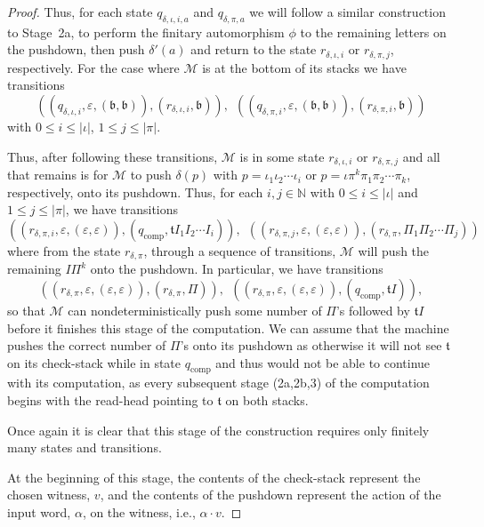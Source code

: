 \begin{proof}
	Thus, for each state $q_{\delta,\iota,i,a}$ and $q_{\delta,\pi,a}$ we will follow a similar construction to Stage~2a, to perform the finitary automorphism $\phi$ to the remaining letters on the pushdown, then push $\delta'(a)$ and return to the state $r_{\delta,\iota,i}$ or $r_{\delta,\pi,j}$, respectively.
	For the case where $\mathcal{M}$ is at the bottom of its stacks we have transitions
	\[
	(
	(q_{\delta,\iota,i}, \varepsilon, (\mathfrak{b},\mathfrak{b})),
	(r_{\delta,\iota,i}, \mathfrak{b})
	),\ \ 
	(
	(q_{\delta,\pi,i}, \varepsilon, (\mathfrak{b},\mathfrak{b})),
	(r_{\delta,\pi,i}, \mathfrak{b})
	)
	\]
	with $0 \leq i \leq |\iota|$, $1 \leq j \leq |\pi|$.
	
	Thus, after following these transitions, $\mathcal{M}$ is in some state $r_{\delta,\iota,i}$ or $r_{\delta,\pi,j}$ and all that remains is for $\mathcal{M}$ to push $\delta(p)$ with $p = \iota_1 \iota_2\cdots \iota_i$ or $p = \iota\pi^k\pi_1 \pi_2\cdots \pi_k$, respectively, onto its pushdown.
	Thus, for each $i,j\in \mathbb{N}$ with $0 \leq i \leq |\iota|$ and $1 \leq j \leq |\pi|$, we have transitions
	\[
	(
	(r_{\delta,\pi,i}, \varepsilon,(\varepsilon,\varepsilon)),
	(q_\mathrm{comp}, \mathfrak{t} I_1 I_2 \cdots I_i)
	),
	\ \ 
	(
	(r_{\delta,\pi,j}, \varepsilon,(\varepsilon,\varepsilon)),
	(r_{\delta,\pi}, \Pi_1 \Pi_2 \cdots \Pi_j)
	)
	\]
	where from the state $r_{\delta,\pi}$, through a sequence of transitions, $\mathcal{M}$ will push the remaining $I\Pi^k$ onto the pushdown.
	In particular, we have transitions
	\[
	(
	(r_{\delta,\pi}, \varepsilon,(\varepsilon,\varepsilon)),
	(r_{\delta,\pi},\Pi)
	),
	\ \ 
	(
	(r_{\delta,\pi}, \varepsilon,(\varepsilon,\varepsilon)),
	(q_\mathrm{comp},\mathfrak{t}I)
	),
	\]
	so that $\mathcal{M}$ can nondeterministically push some number of $\Pi$'s followed by $\mathfrak{t}I$  before it finishes this stage of the computation.
	We can assume that the machine pushes the correct number of $\Pi$'s onto its pushdown as otherwise it will not see $\mathfrak{t}$ on its check-stack while in state $q_\mathrm{comp}$ and thus would not be able to continue with its computation, as every subsequent stage (2a,2b,3) of the computation begins with the read-head pointing to $\mathfrak{t}$ on both stacks.
	
	Once again it is clear that this stage of the construction requires only finitely many states and transitions.
	
	
	At the beginning of this stage, the contents of the check-stack represent the chosen witness, $v$, and the contents of the pushdown represent the action of the input word, $\alpha$, on the witness, i.e., $\alpha \cdot v$.
	

\end{proof}
